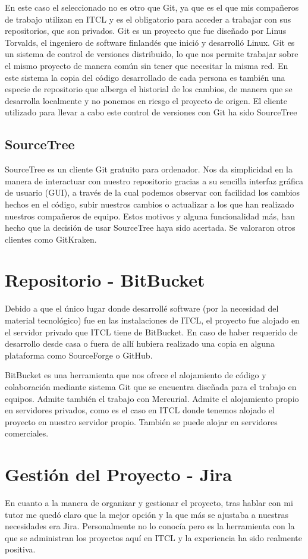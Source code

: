 En este caso el seleccionado no es otro que Git, ya que es el que mis compañeros de trabajo utilizan en ITCL y es el obligatorio para acceder a trabajar con sus repositorios, que son privados. Git es un proyecto que fue diseñado por Linus Torvalds, el ingeniero de software finlandés que inició y desarrolló Linux. Git es un sistema de control de versiones distribuido, lo que nos permite trabajar sobre el mismo proyecto de manera común sin tener que necesitar la misma red. En este sistema la copia del código desarrollado de cada persona es también una especie de repositorio que alberga el historial de los cambios, de manera que se desarrolla localmente y no ponemos en riesgo el proyecto de origen.
El cliente utilizado para llevar a cabo este control de versiones con Git ha sido SourceTree
\subsection{SourceTree}
SourceTree\cite{SourceTree} es un cliente Git gratuito para ordenador. Nos da simplicidad en la manera de interactuar con nuestro repositorio gracias a su sencilla interfaz gráfica de usuario (GUI), a través de la cual podemos observar con facilidad los cambios hechos en el código, subir nuestros cambios o actualizar a los que han realizado nuestros compañeros de equipo. Estos motivos y alguna funcionalidad más, han hecho que la decisión de usar SourceTree haya sido acertada. Se valoraron otros clientes como GitKraken.
\newpage
\section{Repositorio - BitBucket}
Debido a que el único lugar donde desarrollé software (por la necesidad del material tecnológico) fue en las instalaciones de ITCL, el proyecto fue alojado en el servidor privado que ITCL tiene de BitBucket. En caso de haber requerido de desarrollo desde casa o fuera de allí hubiera realizado una copia en alguna plataforma como SourceForge o GitHub.

BitBucket es una herramienta que nos ofrece el alojamiento de código y colaboración mediante sistema Git que se encuentra diseñada para el trabajo en equipos. Admite también el trabajo con Mercurial. Admite el alojamiento propio en servidores privados, como es el caso en ITCL donde tenemos alojado el proyecto en nuestro servidor propio. También se puede alojar en servidores comerciales.

\section{Gestión del Proyecto - Jira}
En cuanto a la manera de organizar y gestionar el proyecto, tras hablar con mi tutor me quedó claro que la mejor opción y la que más se ajustaba a nuestras necesidades era Jira\cite{Jira}. Personalmente no lo conocía pero es la herramienta con la que se administran los proyectos aquí en ITCL y la experiencia ha sido realmente positiva.

